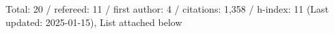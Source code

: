 Total: 20 / refereed: 11 / first author: 4 / citations: 1,358 / h-index: 11 (Last updated: 2025-01-15), List attached below